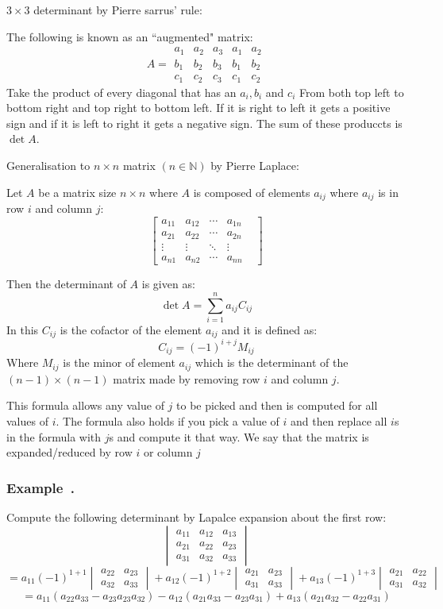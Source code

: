 \documentclass{article}
\newcommand{\bb}[1]{\mathbb{#1}}
\newcounter{example}[section]
\newenvironment{example}[1][]{\refstepcounter{example}\vspace{-0.2cm}
\subsubsection*{Example~\thesection.\theexample} \rmfamily}{\par}
\begin{document}
\(3\times3\) determinant by Pierre sarrus' rule:

The following is known as an ``augmented" matrix:
\[A=
\begin{array}{|ccc|cc|}
a_1 & a_2 & a_3 & a_1 & a_2\\
b_1 & b_2 & b_3 & b_1 & b_2\\
c_1 & c_2 & c_3 & c_1 & c_2
\end{array}
\]
Take the product of every diagonal that has an \(a_i,b_i\) and \(c_i\) From both top left to bottom right and top right to bottom left. If it is right to left it gets a positive sign and if it is left to right it gets a negative sign. The sum of these produccts is \(\det A\).

Generalisation to \(n\times n\) matrix \((n\in\bb N)\) by Pierre Laplace:

Let \(A\) be a matrix size \(n\times n\) where \(A\) is composed of elements \(a_{ij}\) where \(a_{ij}\) is in row \(i\) and column \(j\):
\[
\begin{bmatrix}
a_{11} & a_{12} & \cdots & a_{1n}\\
a_{21} & a_{22} & \cdots & a_{2n}&\\
\vdots &\vdots & \ddots &\vdots &\\
a_{n1} & a_{n2} & \cdots & a_{nn}
\end{bmatrix}
\]

Then the determinant of \(A\) is given as:
\[\det A=\sum_{i=1}^na_{ij}C_{ij}\]
In this \(C_{ij}\) is the cofactor of the element \(a_{ij}\) and it is defined as:
\[C_{ij}=(-1)^{i+j}M_{ij}\]
Where \(M_{ij}\) is the minor of element \(a_{ij}\) which is the determinant of the \((n-1)\times(n-1)\) matrix made by removing row \(i\) and column \(j\).

This formula allows any value of \(j\) to be picked and then is computed for all values of \(i\). The formula also holds if you pick a value of \(i\) and then replace all \(i\)s in the formula with \(j\)s and compute it that way. We say that the matrix is expanded/reduced by row \(i\) or column \(j\)

\begin{example}
Compute the following determinant by Lapalce expansion about the first row:
\[
\begin{vmatrix}
a_{11} & a_{12} & a_{13}\\
a_{21} & a_{22} & a_{23}\\
a_{31} & a_{32} & a_{33}
\end{vmatrix}
\]
\[=a_{11}(-1)^{1+1}
\begin{vmatrix}
a_{22} & a_{23}\\
a_{32} & a_{33}
\end{vmatrix}
+a_{12}(-1)^{1+2}
\begin{vmatrix}
a_{21} & a_{23}\\
a_{31} & a_{33}
\end{vmatrix}
+a_{13}(-1)^{1+3}
\begin{vmatrix}
a_{21} & a_{22}\\
a_{31} & a_{32}
\end{vmatrix}
\]
\[=a_{11}(a_{22}a_{33}-a_{23}a_{23}a_{32})-a_{12}(a_{21}a_{33}-a_{23}a_{31})+a_{13}(a_{21}a_{32}-a_{22}a_{31})\]
\end{example}
\end{document}
